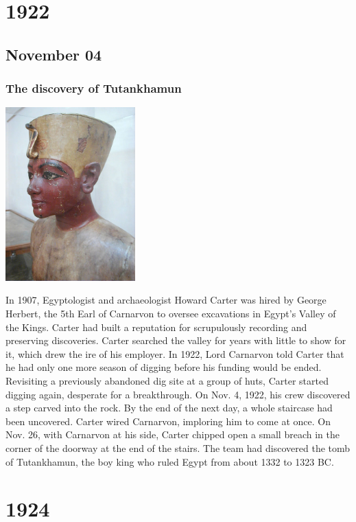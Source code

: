 \documentclass[11pt]{report}
\begin{document}
\chapter{1922}
\section{November 04}
\subsection{The discovery of Tutankhamun}
\vspace{2mm}\begin{center}\includegraphics[width=5cm]{./img/tutankhamon.jpg}\end{center}
In 1907, Egyptologist and archaeologist Howard Carter was hired by George Herbert, the 5th Earl of Carnarvon to oversee excavations in Egypt’s Valley of the Kings. Carter had built a reputation for scrupulously recording and preserving discoveries.
Carter searched the valley for years with little to show for it, which drew the ire of his employer. In 1922, Lord Carnarvon told Carter that he had only one more season of digging before his funding would be ended.\\
\indent Revisiting a previously abandoned dig site at a group of huts, Carter started digging again, desperate for a breakthrough.
On Nov. 4, 1922, his crew discovered a step carved into the rock. By the end of the next day, a whole staircase had been uncovered. Carter wired Carnarvon, imploring him to come at once.
On Nov. 26, with Carnarvon at his side, Carter chipped open a small breach in the corner of the doorway at the end of the stairs.
The team had discovered the tomb of Tutankhamun, the boy king who ruled Egypt from about 1332 to 1323 BC.

\chapter{1924}
\end{document}
